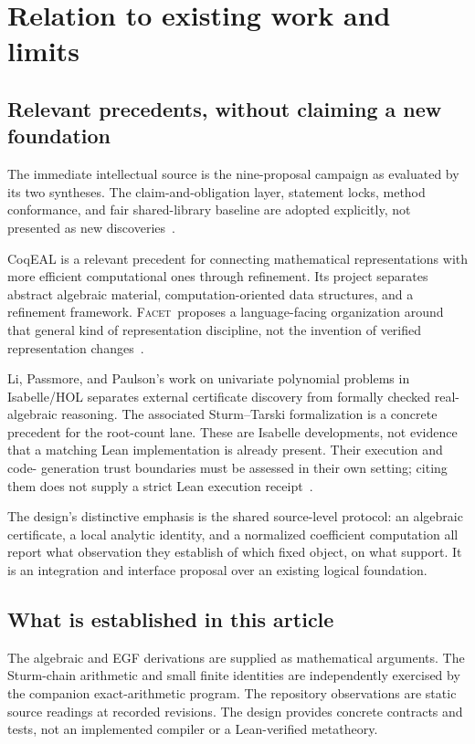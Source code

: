 \documentclass[11pt,a4paper]{article}
\newcommand{\Facet}{\textsc{Facet}}
\theoremstyle{definition}
\begin{document}
\section{Relation to existing work and limits}\label{sec:prior}
\subsection{Relevant precedents, without claiming a new foundation}
The immediate intellectual source is the nine-proposal campaign as evaluated by
its two syntheses. The claim-and-obligation layer, statement locks, method
conformance, and fair shared-library baseline are adopted explicitly, not
presented as new discoveries~\cite{synthesis,blueprints}.

CoqEAL is a relevant precedent for connecting mathematical representations with
more efficient computational ones through refinement. Its project separates
abstract algebraic material, computation-oriented data structures, and a
refinement framework. \Facet\ proposes a language-facing organization around
that general kind of representation discipline, not the invention of verified
representation changes~\cite{coqeal}.

Li, Passmore, and Paulson's work on univariate polynomial problems in Isabelle/HOL
separates external certificate discovery from formally checked real-algebraic
reasoning. The associated Sturm--Tarski formalization is a concrete precedent
for the root-count lane. These are Isabelle developments, not evidence that a
matching Lean implementation is already present. Their execution and code-
generation trust boundaries must be assessed in their own setting; citing them
does not supply a strict Lean execution receipt~\cite{univariate,sturm}.

The design's distinctive emphasis is the shared source-level protocol: an
algebraic certificate, a local analytic identity, and a normalized coefficient
computation all report what observation they establish of which fixed object,
on what support. It is an integration and interface proposal over an existing
logical foundation.

\subsection{What is established in this article}
The algebraic and EGF derivations are supplied as mathematical arguments. The
Sturm-chain arithmetic and small finite identities are independently exercised
by the companion exact-arithmetic program. The repository observations are
static source readings at recorded revisions. The design provides concrete
contracts and tests, not an implemented compiler or a Lean-verified metatheory.
\end{document}
